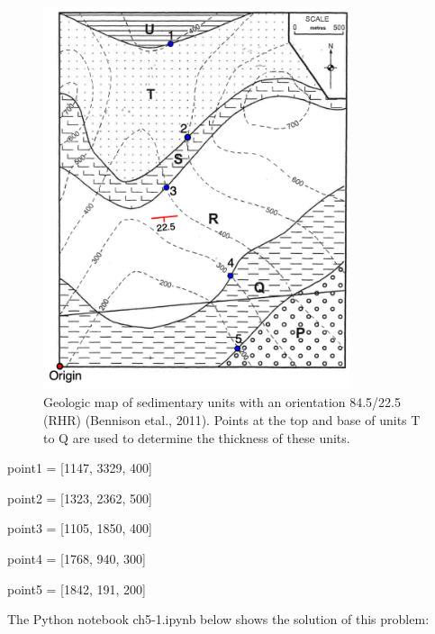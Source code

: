 \documentclass[a4paper , 12pt]{book}
\begin{document}
 \begin{figure}[H]
    \centering
    \includegraphics[width=9cm]{Figures/ch5f4.png}
    \caption{Geologic map of sedimentary units with an orientation 84.5/22.5 (RHR) (Bennison etal.,  2011). Points at the top and base of units T to Q are used to determine the thickness of these units.}
\end{figure}

point1 = [1147, 3329, 400]

point2 = [1323, 2362, 500]

point3 = [1105, 1850, 400]

point4 = [1768, 940, 300]

point5 = [1842, 191, 200]

The Python notebook ch5-1.ipynb below shows the solution of this problem:
\end{document}
